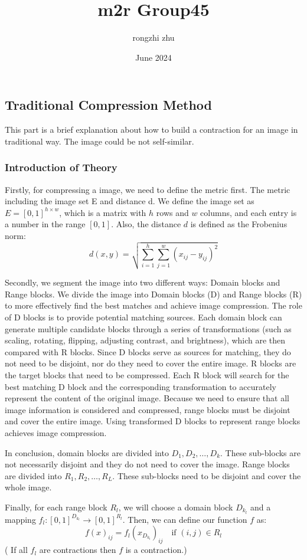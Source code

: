 \documentclass{article}
\title{m2r Group45}
\author{rongzhi zhu}
\date{June 2024}
\begin{document}
\doublespacing

\subsection{Traditional Compression Method}
This part is a brief explanation about how to build a contraction for an image in traditional way. The image could be not self-similar.
\subsubsection{Introduction of Theory}

Firstly, for compressing a image, we need to define the metric first. The metric including the image set E and distance d. We define the image set as \( E = [0,1]^{h \times w} \), which is a matrix with \( h \) rows and \( w \) columns, and each entry is a number in the range \([0,1]\). Also, the distance \( d \) is defined as the Frobenius norm:
\[
d(x, y) = \sqrt{\sum_{i=1}^{h} \sum_{j=1}^{w} (x_{ij} - y_{ij})^2}
\]

Secondly, we segment the image into two different ways: Domain blocks and Range blocks. We divide the image into Domain blocks (D) and Range blocks (R) to more effectively find the best matches and achieve image compression. The role of D blocks is to provide potential matching sources. Each domain block can generate multiple candidate blocks through a series of transformations (such as scaling, rotating, flipping, adjusting contrast, and brightness), which are then compared with R blocks. Since D blocks serve as sources for matching, they do not need to be disjoint, nor do they need to cover the entire image.
R blocks are the target blocks that need to be compressed. Each R block will search for the best matching D block and the corresponding transformation to accurately represent the content of the original image. Because we need to ensure that all image information is considered and compressed, range blocks must be disjoint and cover the entire image. Using transformed D blocks to represent range blocks achieves image compression.

In conclusion, domain blocks are divided into \( D_1, D_2, \ldots, D_k \). These sub-blocks are not necessarily disjoint and they do not need to cover the image. Range blocks are divided into \( R_1, R_2, \ldots, R_L \). These sub-blocks need to be disjoint and cover the whole image.

Finally, for each range block \( R_l \), we will choose a domain block \( D_{k_l} \) and a mapping \( f_l : [0, 1]^{D_{k_l}} \rightarrow [0, 1]^{R_l} \). Then, we can define our function \( f \) as:
\[
f(x)_{ij} = f_l(x_{D_{k_l}})_{ij} \quad \text{if } (i,j) \in R_l
\]
( If all \( f_l \) are contractions then \( f \) is a contraction.)
\end{document}
